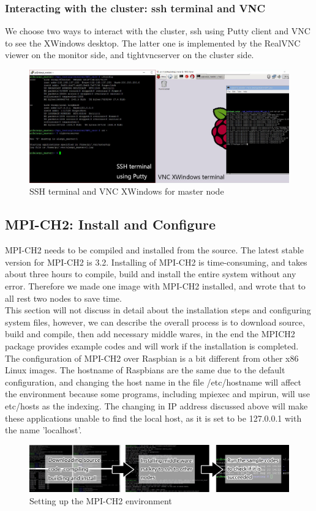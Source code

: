 \documentclass[11pt,openright,a4paper]{report}
\begin{document}
\subsubsection{Interacting with the cluster: ssh terminal and VNC}
We choose two ways to interact with the cluster, ssh using Putty client and VNC to see the XWindows desktop. The latter one is implemented by the RealVNC viewer on the monitor side\cite{realvnc}, and tightvncserver on the cluster side\cite{xtightvncserver}.\\
\begin{figure}[H]
\centering
\includegraphics[width=0.9\linewidth]{picture/terminal}
\caption{SSH terminal and VNC XWindows for master node}
\label{fig:terminal}
\end{figure}
\subsection{MPI-CH2: Install and Configure}
MPI-CH2 needs to be compiled and installed from the source. The latest stable version for MPI-CH2 is 3.2. Installing of MPI-CH2 is time-consuming, and takes about three hours to compile, build and install the entire system without any error. Therefore we made one image with MPI-CH2 installed, and wrote that to all rest two nodes to save time.\\
This section will not discuss in detail about the installation steps and configuring system files, however, we can describe the overall process is to download source, build and compile, then add necessary middle wares, in the end the MPICH2 package provides example codes and will work if the installation is completed. The configuration of MPI-CH2 over Raspbian is a bit different from other x86 Linux images. The hostname of Raspbians are the same due to the default configuration, and changing the host name in the file /etc/hostname will affect the environment because some programs, including mpiexec and mpirun, will use etc/hosts as the indexing. The changing in IP address discussed above will make these applications unable to find the local host, as it is set to be 127.0.0.1 with the name 'localhost'.\\
\begin{figure}[H]
\centering
\includegraphics[width=0.9\linewidth]{picture/mpi-setup/setpsMPICH2}
\caption{Setting up the MPI-CH2 environment}
\label{fig:setpsMPICH2}
\end{figure}
\end{document}
